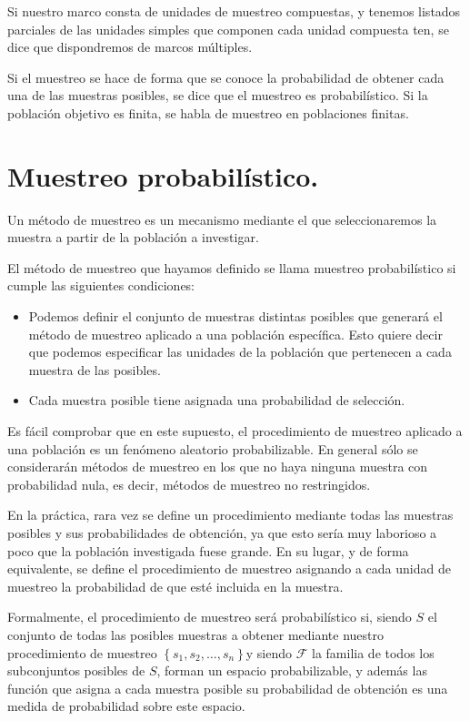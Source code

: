 Si nuestro marco consta de unidades de muestreo compuestas, y tenemos
listados parciales de las unidades simples que componen cada unidad
compuesta ten, se dice que dispondremos de marcos m\'ultiples.

Si el muestreo se hace de forma que se conoce la probabilidad de obtener
cada una de las muestras posibles, se dice que el muestreo es probabil\'istico.
Si la poblaci\'on objetivo es finita, se habla de muestreo en poblaciones
finitas.


\section{Muestreo probabil\'istico.}

Un m\'etodo de muestreo es un mecanismo mediante el que seleccionaremos
la muestra a partir de la poblaci\'on a investigar.

El m\'etodo de muestreo que hayamos definido se llama muestreo probabil\'istico
si cumple las siguientes condiciones:
\begin{itemize}
\item Podemos definir el conjunto de muestras distintas posibles que generar\'a
el m\'etodo de muestreo aplicado a una poblaci\'on espec\'ifica. Esto quiere
decir que podemos especificar las unidades de la poblaci\'on que pertenecen
a cada muestra de las posibles.
\item Cada muestra posible tiene asignada una probabilidad de selecci\'on. 
\end{itemize}
Es f\'acil comprobar que en este supuesto, el procedimiento de muestreo
aplicado a una poblaci\'on es un fen\'omeno aleatorio probabilizable.
En general s\'olo se considerar\'an m\'etodos de muestreo en los que no
haya ninguna muestra con probabilidad nula, es decir, m\'etodos de muestreo
no restringidos.

En la pr\'actica, rara vez se define un procedimiento mediante todas
las muestras posibles y sus probabilidades de obtenci\'on, ya que esto
ser\'ia muy laborioso a poco que la poblaci\'on investigada fuese grande.
En su lugar, y de forma equivalente, se define el procedimiento de
muestreo asignando a cada unidad de muestreo la probabilidad de que
est\'e incluida en la muestra.

Formalmente, el procedimiento de muestreo ser\'a probabil\'istico si,
siendo $S$ el conjunto de todas las posibles muestras a obtener mediante
nuestro procedimiento de muestreo $\left\{ s_{1},s_{2},\ldots,s_{n}\right\} $y
siendo $\mathcal{F}$ la familia de todos los subconjuntos posibles
de $S$, forman un espacio probabilizable, y adem\'as las funci\'on que
asigna a cada muestra posible su probabilidad de obtenci\'on es una
medida de probabilidad sobre este espacio.


